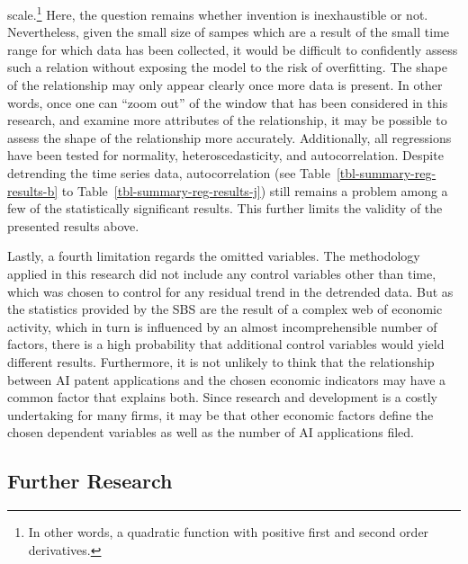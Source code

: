 \documentclass[
  12pt,
  a4paperpaper,
]{article}
\begin{document}
scale.\footnote{In other words, a quadratic function with positive first
  and second order derivatives.} Here, the question remains whether
invention is inexhaustible or not. Nevertheless, given the small size of
sampes which are a result of the small time range for which data has
been collected, it would be difficult to confidently assess such a
relation without exposing the model to the risk of overfitting. The
shape of the relationship may only appear clearly once more data is
present. In other words, once one can ``zoom out'' of the window that
has been considered in this research, and examine more attributes of the
relationship, it may be possible to assess the shape of the relationship
more accurately. Additionally, all regressions have been tested for
normality, heteroscedasticity, and autocorrelation. Despite detrending
the time series data, autocorrelation (see
Table~\ref{tbl-summary-reg-results-b} to
Table~\ref{tbl-summary-reg-results-j}) still remains a problem among a
few of the statistically significant results. This further limits the
validity of the presented results above.

Lastly, a fourth limitation regards the omitted variables. The
methodology applied in this research did not include any control
variables other than time, which was chosen to control for any residual
trend in the detrended data. But as the statistics provided by the SBS
are the result of a complex web of economic activity, which in turn is
influenced by an almost incomprehensible number of factors, there is a
high probability that additional control variables would yield different
results. Furthermore, it is not unlikely to think that the relationship
between AI patent applications and the chosen economic indicators may
have a common factor that explains both. Since research and development
is a costly undertaking for many firms, it may be that other economic
factors define the chosen dependent variables as well as the number of
AI applications filed.

\subsection{Further Research}\label{sec-further-research}
\end{document}
